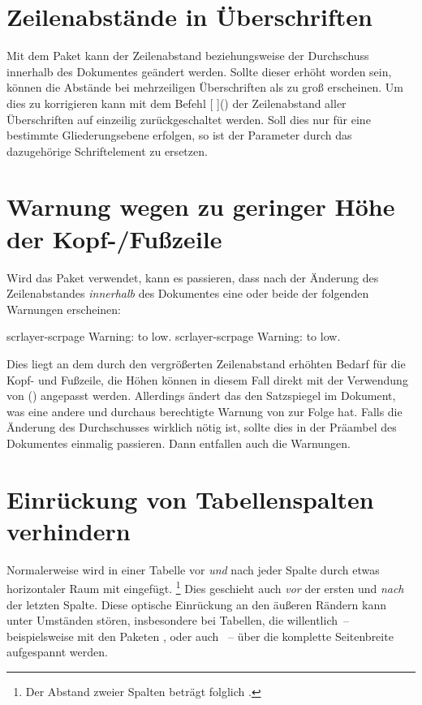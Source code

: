 \section{Zeilenabstände in Überschriften}
%
%
%
%
Mit dem Paket  kann der Zeilenabstand beziehungsweise der 
Durchschuss innerhalb des Dokumentes geändert werden. Sollte dieser erhöht 
worden sein, können die Abstände bei mehrzeiligen Überschriften als zu groß 
erscheinen. Um dies zu korrigieren kann mit dem Befehl 
[%
]()
der Zeilenabstand aller Überschriften auf einzeilig zurückgeschaltet werden. 
Soll dies nur für eine bestimmte Gliederungsebene erfolgen, so ist der 
Parameter  durch das dazugehörige Schriftelement zu 
ersetzen.



\section{Warnung wegen zu geringer Höhe der Kopf-/Fußzeile}
%
%
Wird das Paket  verwendet, kann es passieren, dass nach der 
Änderung des Zeilenabstandes \emph{innerhalb} des Dokumentes eine oder beide 
der folgenden Warnungen erscheinen:
%
\begin{quoting}
\begin{Code}
scrlayer-scrpage Warning: \headheight to low.
scrlayer-scrpage Warning: \footheight to low.
\end{Code}
\end{quoting}
%
Dies liegt an dem durch den vergrößerten Zeilenabstand erhöhten Bedarf für die
Kopf- und Fußzeile, die Höhen können in diesem Fall direkt mit der Verwendung 
von () angepasst werden. Allerdings 
ändert das den Satzspiegel im Dokument, was eine andere und durchaus 
berechtigte Warnung von  zur Folge hat. Falls die Änderung 
des Durchschusses wirklich nötig ist, sollte dies in der Präambel des 
Dokumentes einmalig passieren. Dann entfallen auch die Warnungen.



\section{Einrückung von Tabellenspalten verhindern}%
%
%
Normalerweise wird in einer Tabelle vor \emph{und} nach jeder Spalte durch 
 etwas horizontaler Raum mit  
eingefügt.%
\footnote{%
  Der Abstand zweier Spalten beträgt folglich .%
}
Dies geschieht auch \emph{vor} der ersten und \emph{nach} der letzten Spalte. 
Diese optische Einrückung an den äußeren Rändern kann unter Umständen stören, 
insbesondere bei Tabellen, die willentlich~-- beispielsweise mit den Paketen 
,  oder auch ~-- über die 
komplette Seitenbreite aufgespannt werden.

